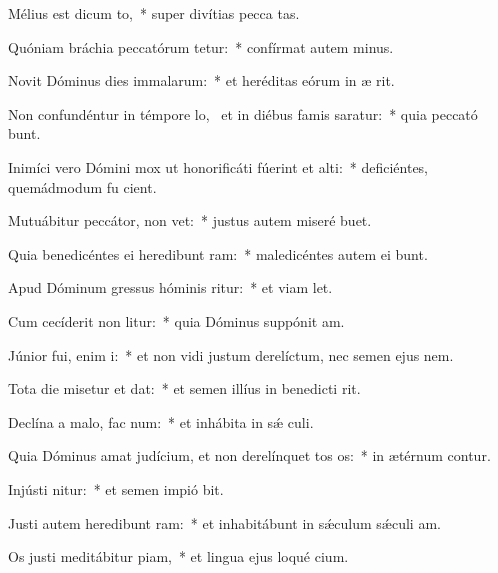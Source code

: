 \item Mélius est dicum to,~* super divítias pecca tas.
\item Quóniam bráchia peccatórum tetur:~* confírmat autem  minus.
\item Novit Dóminus dies immalarum:~* et heréditas eórum in æ rit.
\item Non confundéntur in témpore lo,~\pscross{} et in diébus famis saratur:~* quia peccató bunt.
\item Inimíci vero Dómini mox ut honorificáti fúerint et alti:~* deficiéntes, quemádmodum fu cient.
\item Mutuábitur peccátor,  non vet:~* justus autem miseré  buet.
\item Quia benedicéntes ei heredibunt ram:~* maledicéntes autem ei bunt.
\item Apud Dóminum gressus hóminis ritur:~* et viam  let.
\item Cum cecíderit non litur:~* quia Dóminus suppónit  am.
\item Júnior fui, enim i:~* et non vidi justum derelíctum, nec semen ejus  nem.
\item Tota die misetur et dat:~* et semen illíus in benedicti rit.
\item Declína a malo,  fac num:~* et inhábita in sǽ culi.
\item Quia Dóminus amat judícium, et non derelínquet tos os:~* in ætérnum contur.
\item Injústi nitur:~* et semen impió bit.
\item Justi autem heredibunt ram:~* et inhabitábunt in sǽculum sǽculi  am.
\item Os justi meditábitur piam,~* et lingua ejus loqué cium.
